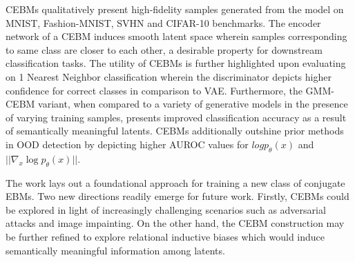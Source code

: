 \documentclass[12pt,letterpaper]{article}
\begin{document}
CEBMs qualitatively present high-fidelity samples generated from the model on MNIST, Fashion-MNIST, SVHN and CIFAR-10 benchmarks. The encoder network of a CEBM induces smooth latent space wherein samples corresponding to same class are closer to each other, a desirable property for downstream classification tasks. The utility of CEBMs is further highlighted upon evaluating on 1 Nearest Neighbor classification wherein the discriminator depicts higher confidence for correct classes in comparison to VAE. Furthermore, the GMM-CEBM variant, when compared to a variety of generative models in the presence of varying training samples, presents improved classification accuracy as a result of semantically meaningful latents. CEBMs additionally outshine prior methods in OOD detection by depicting higher AUROC values for $log p_{\theta}(x)$ and $||\nabla_{x}\log p_{\theta}(x)||$. 

The work lays out a foundational approach for training a new class of conjugate EBMs. Two new directions readily emerge for future work. Firstly, CEBMs could be explored in light of increasingly challenging scenarios such as adversarial attacks and image impainting. On the other hand, the CEBM construction may be further refined to explore relational inductive biases which would induce semantically meaningful information among latents. 
\end{document}
